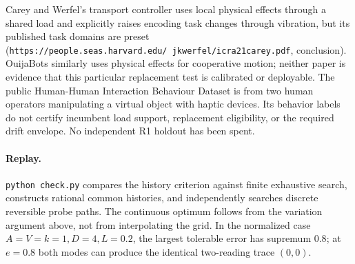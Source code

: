 \documentclass{article}
\begin{document}
Carey and Werfel's transport controller uses local physical effects through a shared load and explicitly raises encoding task changes through vibration, but its published task domains are preset (\texttt{https://people.seas.harvard.edu/\string~jkwerfel/icra21carey.pdf}, conclusion). OuijaBots similarly uses physical effects for cooperative motion; neither paper is evidence that this particular replacement test is calibrated or deployable. The public Human-Human Interaction Behaviour Dataset is from two human operators manipulating a virtual object with haptic devices. Its behavior labels do not certify incumbent load support, replacement eligibility, or the required drift envelope. No independent R1 holdout has been spent.

\paragraph{Replay.}
\texttt{python check.py} compares the history criterion against finite exhaustive search, constructs rational common histories, and independently searches discrete reversible probe paths. The continuous optimum follows from the variation argument above, not from interpolating the grid. In the normalized case \(A=V=k=1,D=4,L=0.2\), the largest tolerable error has supremum \(0.8\); at \(e=0.8\) both modes can produce the identical two-reading trace \((0,0)\).
\end{document}
